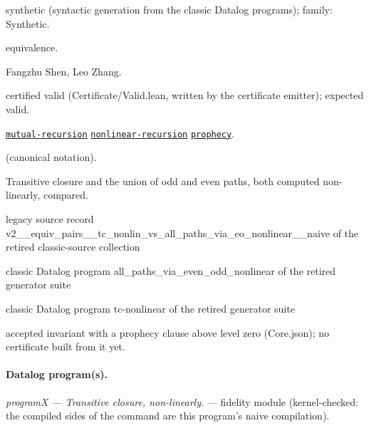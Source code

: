 \documentclass[10pt]{article}
\begin{document}
\begin{description}[leftmargin=2.6cm,style=nextline,itemsep=1pt]

\item[Category] synthetic (syntactic generation from the classic Datalog programs); family: Synthetic.

\item[Kind] equivalence.

\item[Contributors] Fangzhu Shen, Leo Zhang.

\item[Status] certified valid (Certificate/Valid.lean, written by the certificate emitter); expected valid.

\item[Tags] \hyperref[tag:mutual-recursion]{\texttt{mutual-recursion}} \hyperref[tag:nonlinear-recursion]{\texttt{nonlinear-recursion}} \hyperref[tag:prophecy]{\texttt{prophecy}}.

\item[Input]  (canonical notation).

\item[Summary] Transitive closure and the union of odd and even paths, both computed non-linearly, compared.

\item[Sources] {\raggedright legacy source record v2\_\_equiv\_pairs\_\_tc\_nonlin\_vs\_all\_paths\_via\_eo\_nonlinear\_\_naive of the retired classic-source collection \par classic Datalog program all\_paths\_via\_even\_odd\_nonlinear of the retired generator suite \par classic Datalog program tc-nonlinear of the retired generator suite\par}

\item[Prophecy] accepted invariant with a prophecy clause above level zero (Core.json); no certificate built from it yet.

\end{description}

\paragraph{Datalog program(s).}

{\raggedright\textit{programX --- Transitive closure, non-linearly.} --- fidelity module (kernel-checked: the compiled sides of the command are this program's naive compilation).\par}
\end{document}
